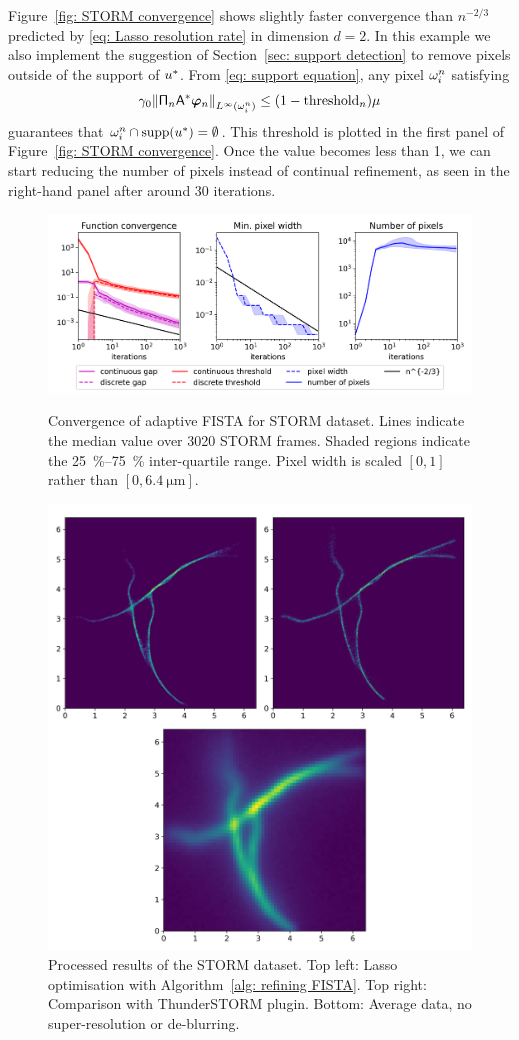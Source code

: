 \documentclass[smallextended]{svjour3}
\newcommand{\norm}[1]{{\left\lVert #1 \right\rVert}}
\newcommand{\op}[1]{\operatorname{#1}}
\newcommand{\1}{\F{1}}
\newcommand*{\varf}[1]{%
	\IfEqCase{#1}{%
		{0}{u}%
		{1}{v}%
		{2}{w}%
	}[u#1]%
}
\newcommand*{\vard}[1]{%
	\IfEqCase{#1}{%
		{0}{\varphi}%
		{1}{\psi}%
	}[\varphi #1]%
}
\newcommand*{\vars}[1]{%
	\IfEqCase{#1}{%
		{0}{\alpha}%
		{1}{\beta}%
		{2}{\gamma}%
		{3}{a}%
		{4}{b}%
		{5}{c}%
	}[k#1]%
}
\newcommand*{\vvard}[1]{\vec{\vard{#1}}}
\begin{document}
	Figure~\ref{fig: STORM convergence} shows slightly faster convergence than $n^{-2/3}$ predicted by \eqref{eq: Lasso resolution rate} in dimension $d=2$. In this example we also implement the suggestion of Section~\ref{sec: support detection} to remove pixels outside of the support of $\varf0^*$. From \eqref{eq: support equation}, any pixel $\omega_i^n$ satisfying 
	\begin{equation}
		\vars2_0 \norm{ \tens{\Pi}_n\A^*\vvard0_n }_{L^\infty(\domain_i^n)} \leq (1-\op{threshold}_n)\mu
	\end{equation}
	guarantees that $\domain_i^n\cap\op{supp}(\varf0^*) = \emptyset$. This threshold is plotted in the first panel of Figure~\ref{fig: STORM convergence}. Once the value becomes less than 1, we can start reducing the number of pixels instead of continual refinement, as seen in the right-hand panel after around 30 iterations.
	
	\begin{figure}\centering
		\includegraphics[width=.82\textwidth]{lasso2_convergence}
		\caption{Convergence of adaptive FISTA for STORM dataset. Lines indicate the median value over 3020 STORM frames. Shaded regions indicate the \SIrange{25}{75}{\percent} inter-quartile range. Pixel width is scaled $[0,1]$ rather than $[0,\SI{6.4}{\micro\meter}]$.}\label{fig: STORM convergence}
		
		\vspace*{\floatsep}
		
		\includegraphics[width=.73\textwidth]{STORM_recon}
		\caption{Processed results of the STORM dataset. Top left: Lasso optimisation with Algorithm~\ref{alg: refining FISTA}. Top right: Comparison with ThunderSTORM plugin. Bottom: Average data, no super-resolution or de-blurring.}\label{fig: STORM results}
	\end{figure}
	
\end{document}
